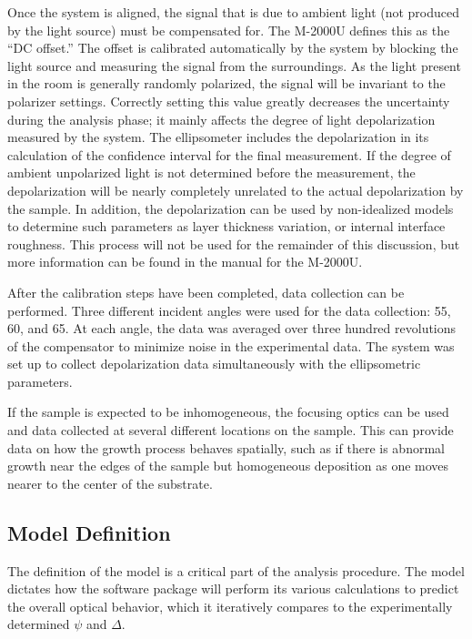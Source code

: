 Once the system is aligned, the signal that is due to ambient light (not produced by the light source) must be compensated for. The M-2000U defines this as the ``DC offset.''\cite{WVASE-manual} The offset is calibrated automatically by the system by blocking the light source and measuring the signal from the surroundings. As the light present in the room is generally randomly polarized, the signal will be invariant to the polarizer settings. Correctly setting this value greatly decreases the uncertainty during the analysis phase; it mainly affects the degree of light depolarization measured by the system. The ellipsometer includes the depolarization in its calculation of the confidence interval for the final measurement. If the degree of ambient unpolarized light is not determined before the measurement, the depolarization will be nearly completely unrelated to the actual depolarization by the sample. In addition, the depolarization can be used by non-idealized models to determine such parameters as layer thickness variation, or internal interface roughness. This process will not be used for the remainder of this discussion, but more information can be found in the manual for the M-2000U.\cite{WVASE-manual} 

After the calibration steps have been completed, data collection can be performed. Three different incident angles were used for the data collection: 55\Deg{}, 60\Deg{}, and 65\Deg{}. At each angle, the data was averaged over three hundred revolutions of the compensator to minimize noise in the experimental data. The system was set up to collect depolarization data simultaneously with the ellipsometric parameters.\cite{WVASE-manual} 

If the sample is expected to be inhomogeneous, the focusing optics can be used and data collected at several different locations on the sample. This can provide data on how the growth process behaves spatially, such as if there is abnormal growth near the edges of the sample but homogeneous deposition as one moves nearer to the center of the substrate. 


\subsection{Model Definition}

The definition of the model is a critical part of the analysis procedure. The model dictates how the software package will perform its various calculations to predict the overall optical behavior, which it iteratively compares to the experimentally determined $\psi$ and $\Delta$. 

